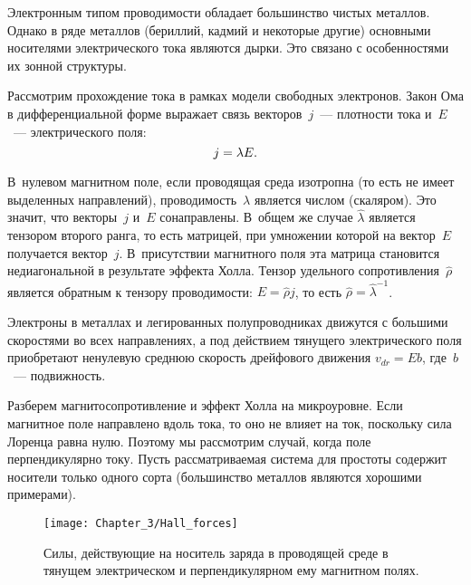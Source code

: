 Электронным типом проводимости обладает большинство чистых металлов. Однако в
ряде металлов (бериллий, кадмий и
некоторые другие) основными носителями электрического тока являются дырки. Это
связано с особенностями их зонной
структуры.


Рассмотрим прохождение тока в рамках модели свободных электронов.
Закон Ома в дифференциальной форме выражает связь векторов~$j$~--- плотности тока
и~$E$~--- электрического поля:
\begin{equation}
	j=\lambda E.
	\eqmark{3.16}
\end{equation}

В~нулевом магнитном поле, если проводящая среда изотропна (то есть не имеет
выделенных направлений), проводимость~$\lambda$ является числом (скаляром). Это
значит, что векторы~$j$ и~$E$ сонаправлены. В~общем же случае
$\widehat{\lambda}$ является тензором второго ранга, то есть матрицей, при
умножении которой на вектор~$E$ получается вектор~$j$. В~присутствии магнитного
поля эта матрица становится недиагональной в результате эффекта Холла. Тензор
удельного сопротивления~$\widehat{\rho}$ является обратным к тензору
проводимости: $E=\widehat{\rho}j$, то есть
$\widehat{\rho}=\widehat{\lambda}^{-1}$.

Электроны в металлах и легированных полупроводниках движутся с большими
скоростями во всех направлениях, а под действием тянущего
электрического поля приобретают ненулевую среднюю скорость дрейфового движения
$v_{dr}=  Eb$, где~$b$~--- подвижность.

Разберем магнитосопротивление и эффект Холла на микроуровне. Если магнитное поле
направлено вдоль тока, то
оно не влияет на ток, поскольку сила Лоренца равна нулю. Поэтому мы рассмотрим
случай, когда поле перпендикулярно
току. Пусть рассматриваемая система для простоты содержит носители только одного
сорта (большинство металлов
являются хорошими примерами).
\begin{figure}[h!]
	\texttt{[image: Chapter\_3/Hall\_forces]}
	\caption{Силы, действующие на носитель заряда в проводящей среде в тянущем
электрическом и перпендикулярном ему магнитном полях.}
\end{figure}

